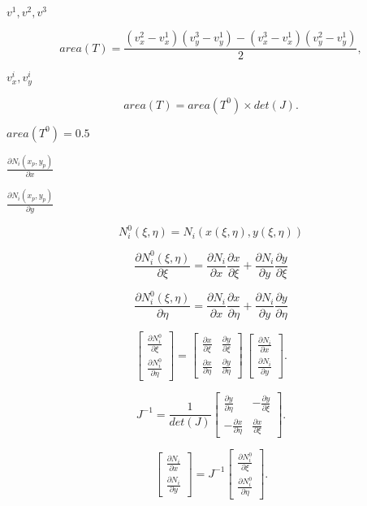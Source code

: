 \documentclass{article}
\begin{document}
$ v^1, v^2, v^3 $
\pagebreak

\[ area(T) = \frac{(v^2_x - v^1_x) (v^3_y - v^1_y) - (v^3_x - v^1_x)
(v^2_y - v^1_y)}{2}, \]
\pagebreak

$ v^i_x, v^i_y $
\pagebreak

\[ area(T) = area (T^0) \times det(J). \]
\pagebreak

$ area(T^0) = 0.5 $
\pagebreak

$ \frac{\partial N_i(x_p, y_p)}{\partial x}$
\pagebreak

$  \frac{\partial N_i(x_p, y_p)}{\partial y}$
\pagebreak

\[ N^0_i(\xi, \eta) = N_i(x(\xi,\eta), y(\xi, \eta)) \]
\pagebreak

\[ \frac{\partial N^0_i(\xi, \eta)}{\partial \xi} = \frac{\partial
N_i}{\partial x} \frac{\partial x}{\partial \xi} + \frac{\partial
N_i}{\partial y} \frac{\partial y}{\partial \xi} \]
\pagebreak

\[ \frac{\partial N^0_i(\xi, \eta)}{\partial \eta} = \frac{\partial
N_i}{\partial x} \frac{\partial x}{\partial \eta} + \frac{\partial
N_i}{\partial y} \frac{\partial y}{\partial \eta} \]
\pagebreak

\[ \left[ {\begin{array}{c} \frac{\partial N^0_i}{\partial \xi} \\
\frac{\partial N^0_i}{\partial \eta} \end{array}}\right] =
\left[ {\begin{array}{cc} \frac{\partial x}{\partial \xi} &
\frac{\partial y}{\partial \xi} \\
\frac{\partial x}{\partial \eta} & \frac{\partial y}{\partial \eta}
\end{array}}\right] \, \left[ {\begin{array}{c} \frac{\partial
N_i}{\partial x} \\
\frac{\partial N_i}{\partial y} \end{array}}\right]. \]
\pagebreak

\[ J^{-1} = \frac{1}{det(J)} \left[ {\begin{array}{cc} \frac{\partial
y}{\partial \eta} & -\frac{\partial y}{\partial \xi} \\
-\frac{\partial x}{\partial \eta} & \frac{\partial x}{\partial \xi}
\end{array}}\right]. \]
\pagebreak

\[ \left[ {\begin{array}{c} \frac{\partial
N_i}{\partial x} \\
\frac{\partial N_i}{\partial y} \end{array}}\right] = J^{-1}
\left[ {\begin{array}{c} \frac{\partial N^0_i}{\partial \xi} \\
\frac{\partial N^0_i}{\partial \eta} \end{array}}\right]. \]
\pagebreak
\end{document}
